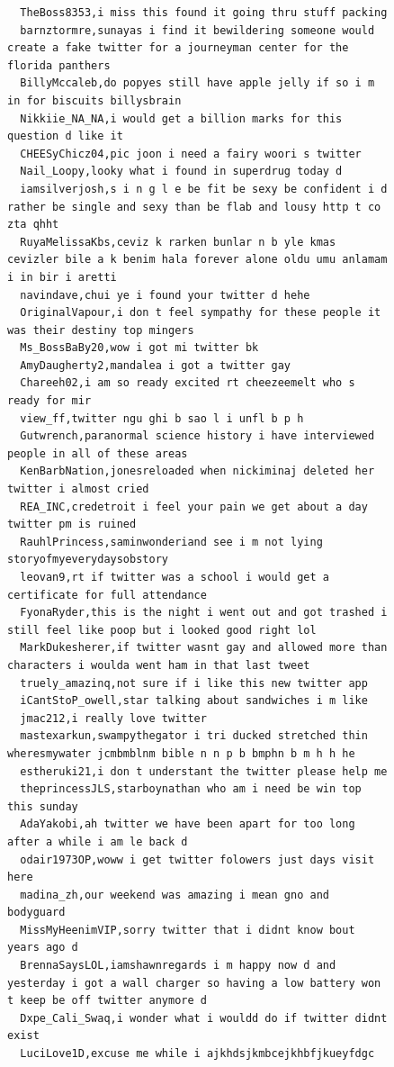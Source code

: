 \begin{figure}[htpb]
\begin{verbatim}
  TheBoss8353,i miss this found it going thru stuff packing
  barnztormre,sunayas i find it bewildering someone would create a fake twitter for a journeyman center for the florida panthers
  BillyMccaleb,do popyes still have apple jelly if so i m in for biscuits billysbrain
  Nikkiie_NA_NA,i would get a billion marks for this question d like it
  CHEESyChicz04,pic joon i need a fairy woori s twitter
  Nail_Loopy,looky what i found in superdrug today d
  iamsilverjosh,s i n g l e be fit be sexy be confident i d rather be single and sexy than be flab and lousy http t co zta qhht
  RuyaMelissaKbs,ceviz k rarken bunlar n b yle kmas cevizler bile a k benim hala forever alone oldu umu anlamam i in bir i aretti
  navindave,chui ye i found your twitter d hehe
  OriginalVapour,i don t feel sympathy for these people it was their destiny top mingers
  Ms_BossBaBy20,wow i got mi twitter bk
  AmyDaugherty2,mandalea i got a twitter gay
  Chareeh02,i am so ready excited rt cheezeemelt who s ready for mir
  view_ff,twitter ngu ghi b sao l i unfl b p h
  Gutwrench,paranormal science history i have interviewed people in all of these areas
  KenBarbNation,jonesreloaded when nickiminaj deleted her twitter i almost cried
  REA_INC,credetroit i feel your pain we get about a day twitter pm is ruined
  RauhlPrincess,saminwonderiand see i m not lying storyofmyeverydaysobstory
  leovan9,rt if twitter was a school i would get a certificate for full attendance
  FyonaRyder,this is the night i went out and got trashed i still feel like poop but i looked good right lol
  MarkDukesherer,if twitter wasnt gay and allowed more than characters i woulda went ham in that last tweet
  truely_amazinq,not sure if i like this new twitter app
  iCantStoP_owell,star talking about sandwiches i m like
  jmac212,i really love twitter
  mastexarkun,swampythegator i tri ducked stretched thin wheresmywater jcmbmblnm bible n n p b bmphn b m h h he
  estheruki21,i don t understant the twitter please help me
  theprincessJLS,starboynathan who am i need be win top this sunday
  AdaYakobi,ah twitter we have been apart for too long after a while i am le back d
  odair1973OP,woww i get twitter folowers just days visit here
  madina_zh,our weekend was amazing i mean gno and bodyguard
  MissMyHeenimVIP,sorry twitter that i didnt know bout years ago d
  BrennaSaysLOL,iamshawnregards i m happy now d and yesterday i got a wall charger so having a low battery won t keep be off twitter anymore d
  Dxpe_Cali_Swaq,i wonder what i wouldd do if twitter didnt exist
  LuciLove1D,excuse me while i ajkhdsjkmbcejkhbfjkueyfdgc

\end{verbatim}
\end{figure}
